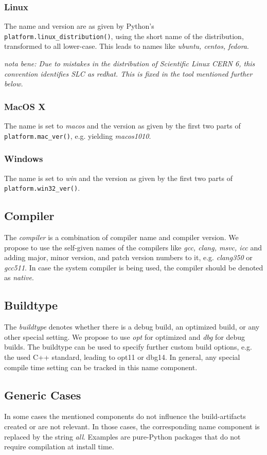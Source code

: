 \documentclass[12pt,a4paper]{article}
\begin{document}
\subsubsection{Linux}
The name and version are as given by Python's \texttt{platform.linux\_distribution()}, using the short name of the distribution, transformed to all lower-case. This leads to names like \emph{ubuntu, centos, fedora}.

\emph{nota bene: Due to mistakes in the distribution of Scientific Linux CERN 6, this convention identifies SLC as redhat. This is fixed in the tool mentioned further below.}

\subsubsection{MacOS X}
The name is set to \emph{macos} and the version as given by the first two parts of \texttt{platform.mac\_ver()}, e.g. yielding \emph{macos1010}.

\subsubsection{Windows}
The name is set to \emph{win} and the version as given by the first two parts of \texttt{platform.win32\_ver()}.


\subsection{Compiler}
The \emph{compiler} is a combination of compiler name and compiler version. We propose to use the self-given names of the compilers like \emph{gcc, clang, msvc, icc} and adding major, minor version, and patch version numbers to it, e.g. \emph{clang350} or \emph{gcc511}. In case the system compiler is being used, the compiler should be denoted as \emph{native}. 


\subsection{Buildtype}
The \emph{buildtype} denotes whether there is a debug build, an optimized build, or any other special setting. We propose to use \emph{opt} for optimized and \emph{dbg} for debug builds. The buildtype can be used to specify further custom build options, e.g. the used C++ standard, leading to opt11 or dbg14.
In general, any special compile time setting can be tracked in this name component.  

\subsection{Generic Cases}
In some cases the mentioned components do not influence the build-artifacts created or are not relevant. In those cases, the corresponding name component is replaced by the string \emph{all}. Examples are pure-Python packages that do not require compilation at install time.
\end{document}
